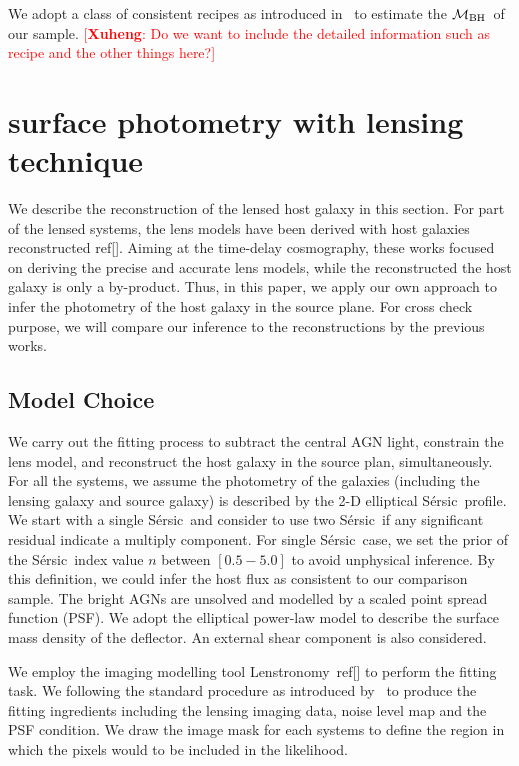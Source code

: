 \documentclass[fleqn,usenatbib]{mnras}
\newcommand{\mbh}{$\mathcal M_{\rm BH}$}
\newcommand{\sersic}{S\'ersic}
\newcommand{\lenstronomy}{{\sc Lenstronomy}}
\newcommand{\ding}[1]{\textcolor{red}{[{\bf Xuheng}: #1]}}
\begin{document}
We adopt a class of consistent recipes as introduced in~\citet{Ding2020} to estimate the \mbh\ of our sample. \ding{Do we want to include the detailed information such as recipe and the other things here?}

\section{surface photometry with lensing technique}
We describe the reconstruction of the lensed host galaxy in this section. For part of the lensed systems, the lens models have been derived with host galaxies reconstructed ref[]. Aiming at the time-delay cosmography, these works focused on deriving the precise and accurate lens models, while the reconstructed the host galaxy is only a by-product. Thus, in this paper, we apply our own approach to infer the photometry of the host galaxy in the source plane. For cross check purpose, we will compare our inference to the reconstructions by the previous works.

\subsection{Model Choice}
We carry out the fitting process to subtract the central AGN light, constrain the lens model, and reconstruct the host galaxy in the source plan, simultaneously.
For all the systems, we assume the photometry of the galaxies (including the lensing galaxy and source galaxy) is described by the 2-D elliptical \sersic\ profile. We start with a single \sersic\ and consider to use two \sersic\ if any significant residual indicate a multiply component. For single \sersic\ case, we set the prior of the \sersic\ index value $n$ between $[0.5-5.0]$ to avoid unphysical inference. By this definition, we could infer the host flux as consistent to our comparison sample. The bright AGNs are unsolved and modelled by a scaled point spread function (PSF). We adopt the elliptical power-law model to describe the surface mass density of the deflector. An external shear component is also considered.

We employ the imaging modelling tool \lenstronomy~ref[] to perform the fitting task. We following the standard procedure as introduced by~\citet{Ding2020} to produce the fitting ingredients including the lensing imaging data, noise level map and the PSF condition. We draw the image mask for each systems to define the region in which the pixels would to be included in the likelihood.
\end{document}
